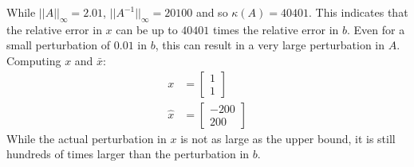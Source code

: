 \documentclass{article}
\begin{document}
While $||A||_\infty = 2.01$, $||A^{-1}||_\infty = 20100$ and so $\kappa(A) = 40401$. This indicates that the relative error in $x$ can be up to $40401$ times the relative error in $b$. Even for a small perturbation of $0.01$ in $b$, this can result in a very large perturbation in $A$. Computing $x$ and $\bar{x}$:
\begin{align*}
    x & = \begin{bmatrix}
        1 \\ 1
    \end{bmatrix} \\
    \hat{x} & = \begin{bmatrix}
        -200 \\ 200
    \end{bmatrix}
\end{align*}
While the actual perturbation in $x$ is not as large as the upper bound, it is still hundreds of times larger than the perturbation in $b$.
\end{document}
